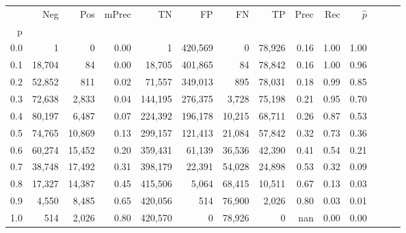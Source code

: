 \begin{tabular}{rrrrrrrrrrrrrr}
\toprule
{} &     Neg &     Pos & mPrec &       TN &       FP &      FN &      TP &  Prec &   Rec & $\hat{p}$ \\
p   &         &         &       &          &          &         &         &       &       &           \\
\midrule
0.0 &       1 &       0 &  0.00 &        1 &  420,569 &       0 &  78,926 &  0.16 &  1.00 &      1.00 \\
0.1 &  18,704 &      84 &  0.00 &   18,705 &  401,865 &      84 &  78,842 &  0.16 &  1.00 &      0.96 \\
0.2 &  52,852 &     811 &  0.02 &   71,557 &  349,013 &     895 &  78,031 &  0.18 &  0.99 &      0.85 \\
0.3 &  72,638 &   2,833 &  0.04 &  144,195 &  276,375 &   3,728 &  75,198 &  0.21 &  0.95 &      0.70 \\
0.4 &  80,197 &   6,487 &  0.07 &  224,392 &  196,178 &  10,215 &  68,711 &  0.26 &  0.87 &      0.53 \\
0.5 &  74,765 &  10,869 &  0.13 &  299,157 &  121,413 &  21,084 &  57,842 &  0.32 &  0.73 &      0.36 \\
0.6 &  60,274 &  15,452 &  0.20 &  359,431 &   61,139 &  36,536 &  42,390 &  0.41 &  0.54 &      0.21 \\
0.7 &  38,748 &  17,492 &  0.31 &  398,179 &   22,391 &  54,028 &  24,898 &  0.53 &  0.32 &      0.09 \\
0.8 &  17,327 &  14,387 &  0.45 &  415,506 &    5,064 &  68,415 &  10,511 &  0.67 &  0.13 &      0.03 \\
0.9 &   4,550 &   8,485 &  0.65 &  420,056 &      514 &  76,900 &   2,026 &  0.80 &  0.03 &      0.01 \\
1.0 &     514 &   2,026 &  0.80 &  420,570 &        0 &  78,926 &       0 &   nan &  0.00 &      0.00 \\
\bottomrule
\end{tabular}
